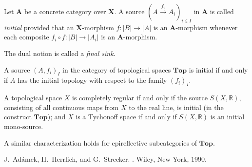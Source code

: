 \documentclass[12pt]{article}
\newcommand{\R}[0]{\mathbb{R}}
\newcommand*{\abs}[1]{| #1 |}
\newcommand{\Map}[3]{#1:#2\to#3}
\newcommand{\Mor}[3]{#2\overset{#1}\to#3}
\newcommand{\Kat}[1]{\mathbf{#1}}
\newcommand{\Top}{\Kat{Top}}
\begin{document}
Let $\Kat A$ be a concrete category over $\Kat X$. A source $(\Mor {f_i}A{A_i})_{i\in I}$ in
$\Kat A$ is called \emph{initial} provided that an $\Kat X$-morphism $\Map f{\abs B}{\abs A}$
is an $\Kat A$-morphism whenever each composite $\Map{f_i\circ f}{\abs B}{\abs {A_i}}$ is an
$\Kat A$-morphism.

The dual notion is called a \emph{final sink}.

A source $(A,f_i)_I$ in the category of topological spaces $\Top$ is initial if and only if
$A$ has the initial topology with respect to the family $(f_i)_I$.

A topological space $X$ is completely regular if and only if the source $S(X,\R)$, consisting
of all continuous maps from $X$ to the real line, is initial (in the construct $\Top$); and
$X$ is a Tychonoff space if and only if $S(X,\R)$ is an initial mono-source.

A similar characterization holds for epireflective subcategories of $\Top$.

\begin{thebibliography}{1}

J.~Ad\'amek, H.~Herrlich, and G.~Strecker.
.
\newblock Wiley, New York, 1990.

\end{thebibliography}

\end{document}
